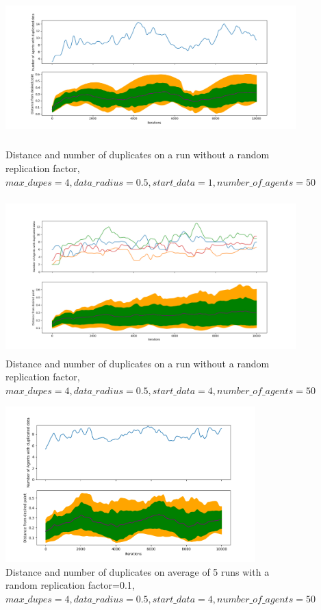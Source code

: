 \documentclass{UoYCSproject}
\begin{document}
\begin{figure}[htb]
\label{fig:Data1}
\begin{center}
\centering
\includegraphics[height=6cm]{"./SimpleSuicRep_m4_r0.5_c1_n50.png"}
\caption{Distance and number of duplicates on a run without a random replication factor, \(max\_dupes=4, data\_radius=0.5, start\_data=1, number\_of\_agents=50\)}
\end{center}
\end{figure}

\begin{figure}[htb]
\label{fig:Data2}
\begin{center}
\centering
\includegraphics[height=6cm]{"./SimpleSuicideReplication_4d_4m_0.5r_50n.png"}
\caption{Distance and number of duplicates on a run without a random replication factor, \(max\_dupes=4, data\_radius=0.5, start\_data=4, number\_of\_agents=50\)}
\end{center}
\end{figure}

\begin{figure}[htb]
\label{fig:Data3}
\begin{center}
\centering
\includegraphics[height=6cm]{"./SimpleSuicideReplication_n50_r0.5_c1_m4_repchance0.1_avg5.png"}
\caption{Distance and number of duplicates on average of 5 runs with a random replication factor=0.1, \(max\_dupes=4, data\_radius=0.5, start\_data=4, number\_of\_agents=50\)}
\end{center}
\end{figure}
\end{document}
